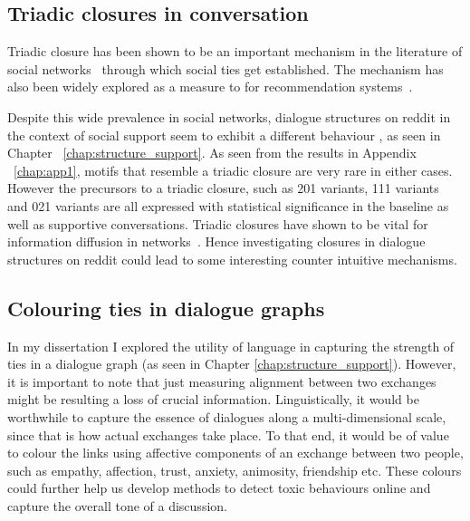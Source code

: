 \subsection{Triadic closures in conversation}
Triadic closure has been shown to be an important mechanism in the literature of social networks~\cite{granovetter1977strength,mollenhorst2011shared} through which social ties get established. The mechanism has also been widely explored as a measure to for recommendation systems~\cite{sintos2014using,lou2013learning}.

Despite this wide prevalence in social networks, dialogue structures on reddit in the context of social support seem to exhibit a different behaviour , as seen in Chapter ~\ref{chap:structure_support}. As seen from the results in Appendix ~\ref{chap:app1}, motifs that resemble a triadic closure are very rare in either cases. However the precursors to a triadic closure, such as 201 variants, 111 variants and 021 variants are all expressed with statistical significance in the baseline as well as supportive conversations. Triadic closures have shown to be vital for information diffusion in networks~\cite{babaei2016efficiency}. Hence investigating closures in dialogue structures on reddit could lead to some interesting counter intuitive mechanisms.

\subsection{Colouring ties in dialogue graphs}
In my dissertation I explored the utility of language in capturing the strength of ties in a dialogue graph (as seen in Chapter \ref{chap:structure_support}). However, it is important to note that just measuring alignment between two exchanges might be resulting a loss of crucial information. Linguistically, it would be worthwhile to capture the essence of dialogues along a multi-dimensional scale, since that is how actual exchanges take place. 
To that end, it would be of value to colour the links using affective components of an exchange between two people, such as empathy, affection, trust, anxiety, animosity, friendship etc. These colours could further help us develop methods to detect toxic behaviours online and capture the overall tone of a discussion. 

